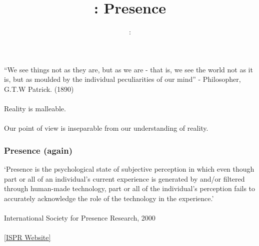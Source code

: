 \usepackage{../../beamerthemeFalmouthGamesAcademy}
\usepackage{multimedia}
\graphicspath{ {../../} }


\usepackage[normalem]{ulem}
\usepackage{wasysym}

\usepackage{pdfpages}

\usetikzlibrary{arrows,automata}




\title{\sessionnumber: Presence}
\subtitle{\modulecode: \moduletitle}

\frame{\titlepage} 

\begin{frame}
	``We see things not as they are, but as we are - that is, we see the world not as it is, but as moulded by the individual peculiarities of our mind'' - Philosopher, G.T.W Patrick. (1890) \\~\\
	\pause
	Reality is malleable. \\~\\ 
	\pause
	Our point of view is inseparable from our understanding of reality. 	
	
\end{frame}


\begin{frame}
	\frametitle{Presence (again)}
	
	`Presence is the psychological state of subjective perception in which even though part or all of an individual's current experience is generated by and/or filtered through human-made technology, part or all of the individual's perception fails to accurately acknowledge the role of the technology in the experience.' \\~\\
	
	International Society for Presence Research, 2000
	\\~\\
	\href{http://ispr.info}{[ISPR Website]}	
	
\end{frame}

